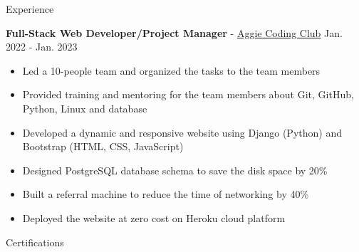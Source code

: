 \documentclass{resume}
\begin{document}
\begin{rSection}{Experience}
    \item \textbf{Full-Stack Web Developer/Project Manager} - \href{https://aggiecodingclub.com}{Aggie Coding Club} \hfill Jan. 2022 - Jan. 2023
        \begin{itemize}
            \item Led a 10-people team and organized the tasks to the team members
            \item Provided training and mentoring for the team members about Git, GitHub, Python, Linux and database
            \item Developed a dynamic and responsive website using Django (Python) and Bootstrap (HTML, CSS, JavaScript)
            \item Designed PostgreSQL database schema to save the disk space by 20\%
            \item Built a referral machine to reduce the time of networking by 40\%
            \item Deployed the website at zero cost on Heroku cloud platform
        \end{itemize}
\end{rSection}


\begin{rSection}{Certifications}
    \vspace{-1.2em}
    \item \href{https://www.coursera.org/account/accomplishments/verify/N4T4JR8XLU3Z}{\color{black}{~~~~\textbullet~~Machine Learning Foundations: Algorithmic Foundations}} \vspace{-0.5em}
    \item \href{https://www.coursera.org/account/accomplishments/verify/4X4TD24NFAY4}{\color{black}{~~~~\textbullet~~Machine Learning Foundations: Mathematical Foundations}} \vspace{-0.5em}
    \item \href{https://www.coursera.org/account/accomplishments/verify/TJKKSPN42ZEE}{\color{black}{~~~~\textbullet~~Machine Learning Techniques}} \vspace{-0.5em}
    \item \href{https://www.coursera.org/account/accomplishments/verify/KHCRSS4J4TZE}{\color{black}{~~~~\textbullet~~Divide and Conquer, Sorting and Searching, and Randomized Algorithms}} \vspace{-0.5em}
    \item \href{https://www.coursera.org/account/accomplishments/verify/5B7WBDL9BHVF}{\color{black}{~~~~\textbullet~~A Crash Course in Causality: Inferring Causal Effects from Observational Data}}  \vspace{-0.5em}
\end{rSection}
\end{document}
